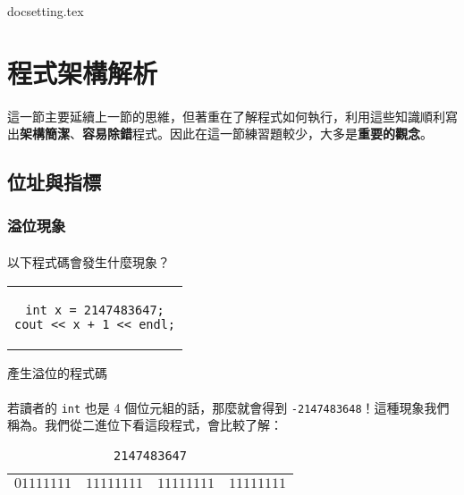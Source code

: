 \documentclass[12pt,a4paper,oneside]{article}
\begin{document}
\begin{CJK}{UTF8}{bkai}

{docsetting.tex}
\setcounter{section}{1}

\fi

\section{程式架構解析}

\paragraph{}這一節主要延續上一節的思維，但著重在了解程式如何執行，利用這些知識順利寫出\textbf{架構簡潔}、\textbf{容易除錯}程式。因此在這一節練習題較少，大多是\textbf{重要的觀念}。

\subsection{位址與指標}

\subsubsection{溢位現象}

\paragraph{}以下程式碼會發生什麼現象？
\begin{code}[h!]
\centering
\begin{tabular}{c}
\begin{lstlisting}
int x = 2147483647;
cout << x + 1 << endl;
\end{lstlisting}
\end{tabular}
\caption{產生溢位的程式碼}
\label{program:struct:code:overflow}
\end{code}

\paragraph{}若讀者的 \lstinline!int! 也是 4 個位元組的話，那麼就會得到 \lstinline!-2147483648!！這種現象我們稱為。我們從二進位下看這段程式，會比較了解：

\begin{table}[h!]
\centering
\begin{tabular}{|c|c|c|c|}
\hline
$01111111$ & $11111111$ & $11111111$ & $11111111$\\
\hline
\end{tabular}
\caption{\lstinline!2147483647!}
\label{program:struct:table:binary:2147483647}
\end{table}


\end{CJK}
\end{document}
